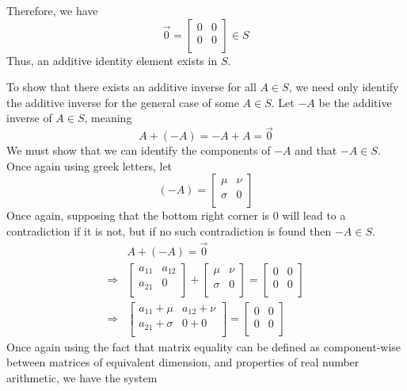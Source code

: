 \documentclass{article}
\begin{document}
Therefore, we have
\[
  \vec{0}=\begin{bmatrix}
    0 &0   \\
     0&0   \\
  \end{bmatrix}\in S
\]
Thus, an additive identity element exists in \(S\). 

To show that there exists an additive inverse for all \(A\in S\), we need only identify the additive inverse for the general case of some \(A\in S\). Let \(-A\) be the additive inverse of \(A\in S\), meaning 
\[
  A+(-A)=-A+A=\vec{0}
\]
We must show that we can identify the components of \(-A\) and that \(-A\in S\). Once again using greek letters, let
\[
  (-A)=\begin{bmatrix}
    \mu    &\nu      \\
     \sigma   &0   \\
  \end{bmatrix}
\]
Once again, supposing that the bottom right corner is \(0\) will lead to a contradiction if it is not, but if no such contradiction is found then \(-A\in S\).
\begin{align*}
  &A+(-A)=\vec{0}\\
\Longrightarrow &\begin{bmatrix}
  a_{11}  &a_{12}    \\
   a_{21} &0    \\
  \end{bmatrix}+\begin{bmatrix}
    \mu  &\nu    \\
     \sigma &0   \\
  \end{bmatrix}=\begin{bmatrix}
    0 &0   \\
     0&0   \\
  \end{bmatrix}\\
  \Longrightarrow &\begin{bmatrix}
    a_{11}+\mu   &a_{12}+\nu     \\
     a_{21}+\sigma  &0+0   \\
  \end{bmatrix}=\begin{bmatrix}
     0&0   \\
     0&0   \\
  \end{bmatrix}
\end{align*}
\newpage
\noindent Once again using the fact that matrix equality can be defined as component-wise between matrices of equivalent dimension, and properties of real number arithmetic, we have the system
\end{document}

